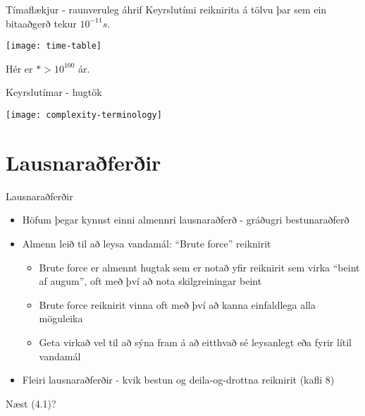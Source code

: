 \documentclass[handout]{beamer}
\begin{document}
\begin{frame}{Tímaflækjur - raunveruleg áhrif}
Keyrslutími reiknirita á tölvu þar sem ein bitaaðgerð tekur $10^{-11}s$.
\begin{center}
\texttt{[image: time-table]}
\end{center}
Hér er $* > 10^{100}$ ár.
\end{frame}

\begin{frame}{Keyrslutímar - hugtök}
\begin{center}
\texttt{[image: complexity-terminology]}
\end{center}
\end{frame}


\section{Lausnaraðferðir}

\begin{frame}{Lausnaraðferðir}
\begin{itemize}
 \item Höfum þegar kynnst einni almennri lausnaraðferð - gráðugri bestunaraðferð
 \item Almenn leið til að leysa vandamál: ``Brute force'' reiknirit
 \begin{itemize}
  \item Brute force er almennt hugtak sem er notað yfir reiknirit sem virka ``beint af augum'', oft með því að nota skilgreiningar beint
  \item Brute force reiknirit vinna oft með því að kanna einfaldlega alla möguleika
  \item Geta virkað vel til að sýna fram á að eitthvað sé leysanlegt eða fyrir lítil vandamál
 \end{itemize}
 \item Fleiri lausnaraðferðir - kvik bestun og deila-og-drottna reiknirit (kafli 8)
\end{itemize}
\end{frame}


\begin{frame}{Næst}
(4.1)?
\end{frame}
\end{document}
